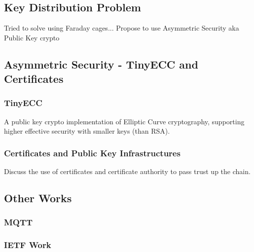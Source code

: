 \documentclass{mprop}
\begin{document}
\subsection{Key Distribution Problem} %
\label{sub:key_distribution_problem}
Tried to solve using Faraday cages...\cite{MessageBottle}
Propose to use Asymmetric Security aka Public Key crypto

\subsection{Asymmetric Security - TinyECC and Certificates} %
\label{sub:asymmetric_security}
\subsubsection{TinyECC} %
\label{ssub:tinyecc}
\cite{TinyECC}
A public key crypto implementation of Elliptic Curve cryptography, supporting higher effective security with smaller keys (than RSA).


\subsubsection{Certificates and Public Key Infrastructures} %
\label{ssub:certificates_and_public_key_infrastructures}
Discuss the use of certificates and certificate authority to pass trust up the chain.


\subsection{Other Works} %
\label{sub:other_works}
\subsubsection{MQTT} %
\label{ssub:mqtt}

\subsubsection{IETF Work} %
\label{ssub:ietf_work}
\cite{IETF_COAP_HTTP, IETF_CORE}

\end{document}
